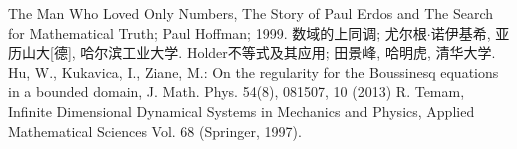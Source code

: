 \begin{thebibliography}{}
  The Man Who Loved Only Numbers, The Story of Paul Erdos and The Search for Mathematical Truth; Paul Hoffman; 1999.
  数域的上同调; 尤尔根$\cdot$诺伊基希, 亚历山大[德], 哈尔滨工业大学.
  Holder不等式及其应用; 田景峰, 哈明虎, 清华大学.
  Hu, W., Kukavica, I., Ziane, M.: On the regularity for the Boussinesq equations in a bounded domain, J. Math. Phys. 54(8), 081507, 10 (2013)
  R. Temam, Infinite Dimensional Dynamical Systems in Mechanics and Physics, Applied Mathematical Sciences Vol. 68
 (Springer, 1997).
\end{thebibliography}
